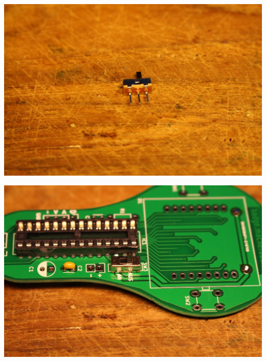 \documentclass{article}
\begin{document}
\begin{minipage}[b]{0.5\textwidth}
	\includegraphics[width=\textwidth]{Bilder2021/IMG_8146.JPG}
\end{minipage}
\begin{minipage}[b]{0.5\textwidth}
	\includegraphics[width=\textwidth]{Bilder2021/IMG_8148.JPG}
\end{minipage}

\vspace{0.5cm}
\end{document}
